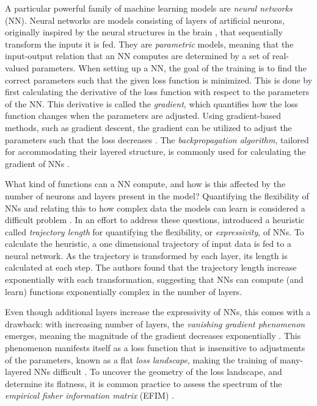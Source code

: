 A particular powerful family of machine learning models are \emph{neural networks} (NN). Neural networks are models consisting of layers of artificial neurons, originally inspired by the neural structures in the brain \cite{hands-on}, that sequentially transform the inputs it is fed. They are \emph{parametric} models, meaning that the input-output relation that an NN computes are determined by a set of real-valued parameters. When setting up a NN, the goal of the training is to find the correct parameters such that the given loss function is minimized. This is done by first calculating the derivative of the loss function with respect to the parameters of the NN. This derivative is called the \emph{gradient}, which quantifies how the loss function changes when the parameters are adjusted. Using gradient-based methods, such as gradient descent, the gradient can be utilized to adjust the parameters such that the loss decreases \cite{hands-on}. The \emph{backpropagation algorithm}, tailored for accommodating their layered structure, is commonly used for calculating the gradient of NNs \cite{hands-on}. 

What kind of functions can a NN compute, and how is this affected by the number of neurons and layers present in the model? Quantifying the flexibility of NNs and relating this to how complex data the models can learn is considered a difficult problem \cite{raghu2017expressive}. In an effort to address these questions, \citet{raghu2017expressive} introduced a heuristic called \emph{trajectory length} for quantifying the flexibility, or \emph{expressivity}, of NNs. To calculate the heuristic, a one dimensional trajectory of input data is fed to a neural network. As the trajectory is transformed by each layer, its length is calculated at each step. The authors found that the trajectory length increase exponentially with each transformation, suggesting that NNs can compute (and learn) functions exponentially complex in the number of layers.  

Even though additional layers increase the expressivity of NNs, this comes with a drawback: with increasing number of layers, the \emph{vanishing gradient phenomenon} emerges, meaning the magnitude of the gradient decreases exponentially \cite{LeCun2012}. This phenomenon manifests itself as a loss function that is insensitive to adjustments of the parameters, known as a flat \emph{loss landscape}, making the training of many-layered NNs difficult \cite{karakida2019universal}. To uncover the geometry of the loss landscape, and determine its flatness, it is common practice to assess the spectrum of the \emph{empirical fisher information matrix} (EFIM) \cite{karakida2019universal}.


